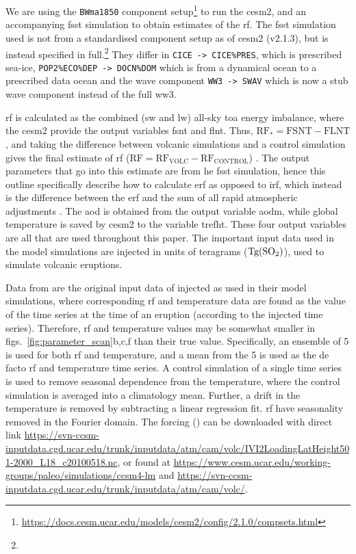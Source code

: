 \documentclass{ametsocV6.1}
\newcommand{\iso}[1][i]{{#1}njected \ce{SO2}}
\begin{document}
We are using the \texttt{BWma1850} component
setup\footnote{\url{https://docs.cesm.ucar.edu/models/cesm2/config/2.1.0/compsets.html}}
to run the \gls{cesm2}, and an accompanying \gls{fsst} simulation to obtain estimates of
the \gls{rf}. The \gls{fsst} simulation used is not from a standardised component setup
as of \gls{cesm2} (v2.1.3), but is instead specified in full.\footnote{\fssturl} They
differ in \texttt{CICE -> CICE\%PRES}, which is prescribed sea-ice,
\texttt{POP2\%ECO\%DEP -> DOCN\%DOM} which is from a dynamical ocean to a prescribed
data ocean and the wave component \texttt{WW3 -> SWAV} which is now a stub wave
component instead of the full \gls{ww3}.

\gls{rf} is calculated as the combined (\gls{sw} and \gls{lw}) all-sky \gls{toa} energy
imbalance, where the \gls{cesm2} provide the output variables \gls{fsnt} and \gls{flnt}.
Thus, \(\mathrm{RF_*}= \mathrm{FSNT} - \mathrm{FLNT}\), and taking the difference
between volcanic simulations and a control simulation gives the final estimate of
\gls{rf} (\(\mathrm{RF}=\mathrm{RF_{VOLC}}-\mathrm{RF_{CONTROL}}\))
\citep{marshall2020}. The output parameters that go into this estimate are from he
\gls{fsst} simulation, hence this outline specifically describe how to calculate
\gls{erf} as opposed to \gls{irf}, which instead is the difference between the \gls{erf}
and the sum of all rapid atmospheric adjustments \citep{marshall2020,smith2018}. The
\gls{aod} is obtained from the output variable \gls{aodm}, while global temperature is
saved by \gls{cesm2} to the variable \gls{trefht}. These four output variables are all
that are used throughout this paper. The important input data used in the model
simulations are \iso{} in units of teragrams (\(\si{\tera\gram(\ce{SO2})}\)), used to
simulate volcanic eruptions.

\appendix[B]

\label{ap:ob16}

Data from \citet{ottobliesner2016} are the original input data of \iso{} as used in
their model simulations, where corresponding \gls{rf} and temperature data are found as
the value of the time series at the time of an eruption (according to the \iso{} time
series). Therefore, \gls{rf} and temperature values may be somewhat smaller in
figs.~\ref{fig:parameter_scan}b,c,f than their true value. Specifically, an ensemble of
5 is used for both \gls{rf} and temperature, and a mean from the 5 is used as the de
facto \gls{rf} and temperature time series. A control simulation of a single time series
is used to remove seasonal dependence from the temperature, where the control simulation
is averaged into a climatology mean. Further, a drift in the temperature is removed by
subtracting a linear regression fit. \gls{rf} have seasonality removed in the Fourier
domain. The forcing () can be downloaded with direct link
\url{https://svn-ccsm-inputdata.cgd.ucar.edu/trunk/inputdata/atm/cam/volc/IVI2LoadingLatHeight501-2000_L18_c20100518.nc},
or found at \url{https://www.cesm.ucar.edu/working-groups/paleo/simulations/ccsm4-lm}
and \url{https://svn-ccsm-inputdata.cgd.ucar.edu/trunk/inputdata/atm/cam/volc/}.
\end{document}
